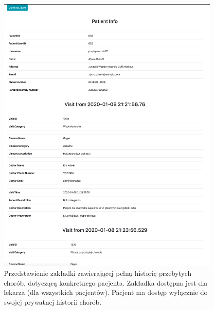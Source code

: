 \begin{figure}[H]
\centering
\includegraphics[width=15cm]{pictures/service/09-history_normal}
\caption{Przedstawienie zakładki zawierającej pełną historię przebytych chorób, dotyczącą konkretnego pacjenta. Zakładka dostępna jest dla lekarza (dla wszystkich pacjentów). Pacjent ma dostęp wyłącznie do swojej prywatnej historii chorób.}
\end{figure}

